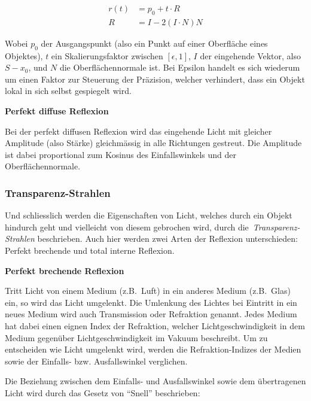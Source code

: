 \begin{align}
    r(t) &= p_{0} + t \cdot R \\
    R &= I - 2(I \cdot N)N
\end{align}

Wobei $p_{0}$ der Ausgangspunkt (also ein Punkt auf einer Oberfläche
eines Objektes), $t$ ein Skalierungsfaktor zwischen $[\epsilon, 1]$, $I$
der eingehende Vektor, also $S - x_{0}$, und $N$ die Oberflächennormale
ist. Bei Epsilon handelt es sich wiederum um einen Faktor zur Steuerung
der Präzision, welcher verhindert, dass ein Objekt lokal in sich selbst
gespiegelt wird.


\textbf{Perfekt diffuse Reflexion}

Bei der perfekt diffusen Reflexion wird das eingehende Licht mit
gleicher Amplitude (also Stärke) gleichmässig in alle Richtungen
gestreut. Die Amplitude ist dabei proportional zum Kosinus des
Einfallswinkels und der Oberflächennormale.



\subsubsection{Transparenz-Strahlen}
\label{ssubsec:ray_tracing:transparency_rays}

Und schliesslich werden die Eigenschaften von Licht, welches durch ein
Objekt hindurch geht und vielleicht von diesem gebrochen wird, durch
die~\textit{Transparenz-Strahlen} beschrieben.  Auch hier werden zwei
Arten der Reflexion unterschieden: Perfekt brechende und total interne
Reflexion.

\textbf{Perfekt brechende Reflexion}

Tritt Licht von einem Medium (z.B.\ Luft) in ein anderes Medium (z.B.\
Glas) ein, so wird das Licht umgelenkt. Die Umlenkung des Lichtes bei
Eintritt in ein neues Medium wird auch Transmission oder Refraktion
genannt. Jedes Medium hat dabei einen eignen Index der Refraktion,
welcher Lichtgeschwindigkeit in dem Medium gegenüber
Lichtgeschwindigkeit im Vakuum beschreibt.
Um zu entscheiden wie Licht umgelenkt wird, werden die
Refraktion-Indizes der Medien sowie der Einfalls- bzw. Ausfallswinkel
verglichen.

Die Beziehung zwischen dem Einfalls- und Ausfallswinkel sowie dem
übertragenen Licht wird durch das Gesetz von ``Snell'' beschrieben:


